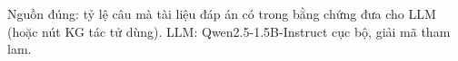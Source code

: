 Nguồn đúng: tỷ lệ câu mà tài liệu đáp án có trong bằng chứng đưa cho LLM (hoặc nút KG tác tử dùng). LLM: Qwen2.5-1.5B-Instruct cục bộ, giải mã tham lam.
